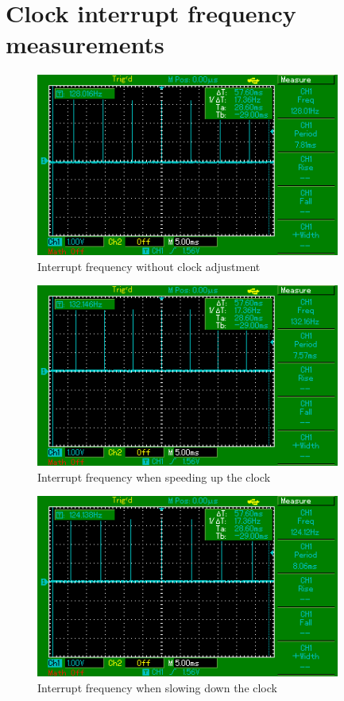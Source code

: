 \chapter{Clock interrupt frequency measurements}\label{app:interrupt-frequency}
\begin{figure}[H]
  \centering
  \includegraphics[width=10cm,keepaspectratio]{fig/osc-no-adjust.png}
  \caption{Interrupt frequency without clock adjustment}
  \label{fig:app-osc-no-adjust}
  \bigskip
\end{figure}

\begin{figure}[H]
  \centering
  \includegraphics[width=10cm,keepaspectratio]{fig/osc-speed-up.png}
  \caption{Interrupt frequency when speeding up the clock}
  \label{fig:app-osc-speed-up}
  \bigskip
\end{figure}

\begin{figure}[H]
  \centering
  \includegraphics[width=10cm,keepaspectratio]{fig/osc-slow-down.png}
  \caption{Interrupt frequency when slowing down the clock}
  \label{fig:app-osc-slow-down}
  \bigskip
\end{figure}


